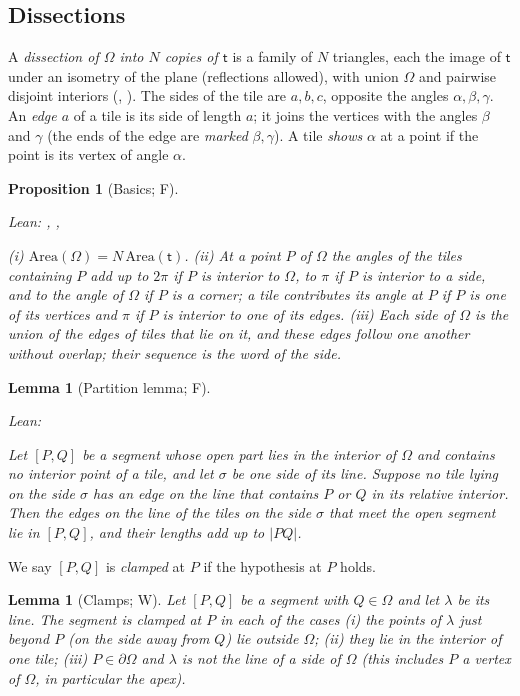 \documentclass[11pt,reqno]{amsart}
\theoremstyle{plain}
\newtheorem{lemma}[theorem]{Lemma}
\newtheorem{proposition}[theorem]{Proposition}
\theoremstyle{definition}
\newcommand{\sF}{\textup{\textsf{F}}}
\newcommand{\sW}{\textup{\textsf{W}}}
\begin{document}
\subsection{Dissections}\label{sub:dissections}
A \emph{dissection of $\Omega$ into $N$ copies of $\mathsf t$} is a family of $N$ triangles, each the image of $\mathsf t$ under an isometry of the plane (reflections allowed), with union $\Omega$ and pairwise disjoint interiors (, ). The sides of the tile are $a,b,c$, opposite the angles $\alpha,\beta,\gamma$. An \emph{edge $a$} of a tile is its side of length $a$; it joins the vertices with the angles $\beta$ and $\gamma$ (the ends of the edge are \emph{marked} $\beta,\gamma$). A tile \emph{shows} $\alpha$ at a point if the point is its vertex of angle $\alpha$.
\begin{proposition}[Basics; \sF]\label{prop:basics}
{\small\noindent\emph{Lean:} , , \par}
(i) $\mathrm{Area}(\Omega)=N\,\mathrm{Area}(\mathsf t)$. (ii) At a point $P$ of $\Omega$ the angles of the tiles containing $P$ add up to $2\pi$ if $P$ is interior to $\Omega$, to $\pi$ if $P$ is interior to a side, and to the angle of $\Omega$ if $P$ is a corner; a tile contributes its angle at $P$ if $P$ is one of its vertices and $\pi$ if $P$ is interior to one of its edges. (iii) Each side of $\Omega$ is the union of the edges of tiles that lie on it, and these edges follow one another without overlap; their sequence is the \emph{word} of the side.
\end{proposition}
\begin{lemma}[Partition lemma; \sF]\label{lem:partition}
{\small\noindent\emph{Lean:} \par}
Let $[P,Q]$ be a segment whose open part lies in the interior of $\Omega$ and contains no interior point of a tile, and let $\sigma$ be one side of its line. Suppose no tile lying on the side $\sigma$ has an edge on the line that contains $P$ or $Q$ in its relative interior. Then the edges on the line of the tiles on the side $\sigma$ that meet the open segment lie in $[P,Q]$, and their lengths add up to $|PQ|$.
\end{lemma}
We say $[P,Q]$ is \emph{clamped} at $P$ if the hypothesis at $P$ holds.
\begin{lemma}[Clamps; \sW]\label{lem:clamp}
Let $[P,Q]$ be a segment with $Q\in\Omega$ and let $\lambda$ be its line. The segment is clamped at $P$ in each of the cases \textup{(i)} the points of $\lambda$ just beyond $P$ (on the side away from $Q$) lie outside $\Omega$; \textup{(ii)} they lie in the interior of one tile; \textup{(iii)} $P\in\partial\Omega$ and $\lambda$ is not the line of a side of $\Omega$ (this includes $P$ a vertex of $\Omega$, in particular the apex).
\end{lemma}
\end{document}
